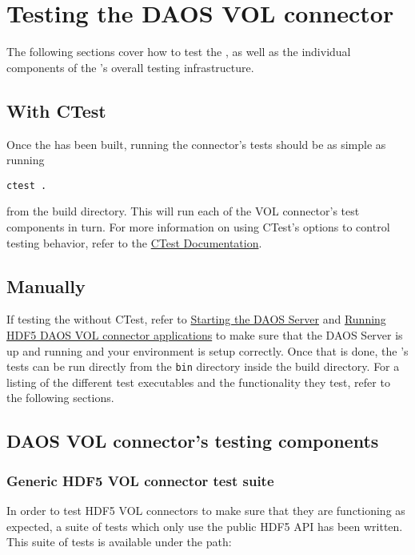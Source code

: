 \documentclass[../users_guide.tex]{subfiles}
\begin{document}
\section{Testing the DAOS VOL connector}

The following sections cover how to test the \dvc{}, as well as the individual components of the \dvc's overall testing infrastructure.

\subsection{With CTest}

Once the \dvc{} has been built, running the connector's tests should be as simple as running

\begin{verbatim}
ctest .
\end{verbatim}

from the build directory. This will run each of the VOL connector's test components in turn. For more information on using CTest's options to control testing behavior, refer to the \href{https://cmake.org/cmake/help/v3.15/manual/ctest.1.html}{CTest Documentation}.

\subsection{Manually}

If testing the \dvc{} without CTest, refer to \hyperref[sec:daos_serv_start]{Starting the DAOS Server} and \hyperref[running_daos_vol_apps]{Running HDF5 DAOS VOL connector applications} to make sure that the DAOS Server is up and running and your environment is setup correctly. Once that is done, the \dvc's tests can be run directly from the \texttt{bin} directory inside the build directory. For a listing of the different test executables and the functionality they test, refer to the following sections.


\subsection{DAOS VOL connector's testing components}

\subsubsection{Generic HDF5 VOL connector test suite}

In order to test HDF5 VOL connectors to make sure that they are functioning as expected, a suite of tests which only use the public HDF5 API has been written. This suite of tests is available under the path:
\end{document}
